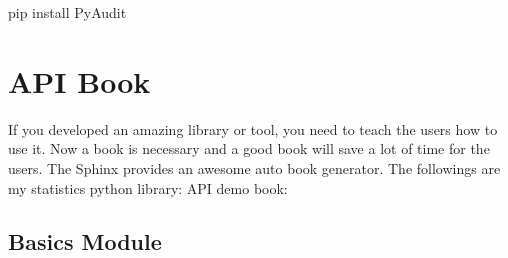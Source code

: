 \documentclass[letterpaper,12pt,english]{sphinxmanual}
\begin{document}
\begin{sphinxVerbatim}[commandchars=\\\{\}]
pip install PyAudit
\end{sphinxVerbatim}


\chapter{API Book}
\label{\detokenize{api:api-book}}\label{\detokenize{api:api}}\label{\detokenize{api::doc}}
If you developed an amazing library or tool, you need to teach the users how to use it. Now a  book is necessary and a good  book will save a lot of time for the users. The Sphinx provides an awesome auto  book generator. The followings are my statistics python library:  API demo book:


\section{Basics Module}
\label{\detokenize{api:basics-module}}

\subsection{}
\label{\detokenize{api:module-statspy.basics}}\label{\detokenize{api:rnorm}}
\end{document}
